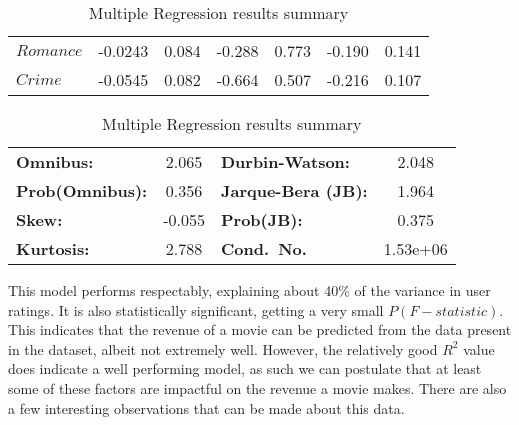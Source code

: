\begin{table}[H]
\begin{center}
\begin{tabular}{lcccccc}
                        \textbf{$Romance$}              & -0.0243       & 0.084            & -0.288     & 0.773               & -0.190          & 0.141           \\
                        \textbf{$Crime$}                & -0.0545       & 0.082            & -0.664     & 0.507               & -0.216          & 0.107           \\
                        \bottomrule
                    \end{tabular}
                    \begin{tabular}{lclc}
                        \textbf{Omnibus:}       & 2.065  & \textbf{  Durbin-Watson:     } & 2.048    \\
                        \textbf{Prob(Omnibus):} & 0.356  & \textbf{  Jarque-Bera (JB):  } & 1.964    \\
                        \textbf{Skew:}          & -0.055 & \textbf{  Prob(JB):          } & 0.375    \\
                        \textbf{Kurtosis:}      & 2.788  & \textbf{  Cond.~No.          } & 1.53e+06 \\
                        \bottomrule
                    \end{tabular}
                \end{center}

                \caption[short]{Multiple Regression results summary}\label{tab:revenue-ols-summary}
            \end{table}
            This model performs respectably, explaining about 40\% of the variance in user
                ratings.
            It is also statistically significant, getting a very small $P(F-statistic)$.
            This indicates that the revenue of a movie can be predicted from the data
                present in the dataset, albeit not extremely well.
            However, the relatively good $R^2$ value does indicate a well performing model,
                as such we can postulate that at least some of these factors are impactful on
                the revenue a movie makes.
            There are also a few interesting observations that can be made about this data.

